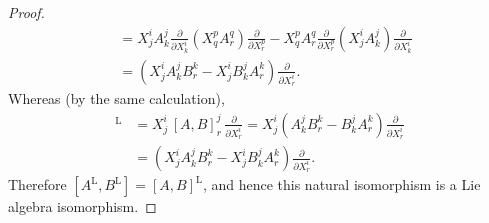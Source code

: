 \documentclass[a4paper]{article}
\theoremstyle{remark}
\newcommand{\doo}{\partial}    %
\newcommand{\Ltegak}{\text{L}} %
\begin{document}
\begin{proof}
\begin{align*}
&=X^i_j A^j_k \frac{\doo}{\doo X^i_k} ( X^p_q A^q_r ) \frac{\doo}{\doo X^p_r}  -  X^p_q A^q_r \frac{\doo}{\doo X^p_r} (X^i_j A^j_k ) \frac{\doo}{\doo X^i_k} \\
&= (X^i_jA^j_k B^k_r  - X^i_jB^j_kA^k_r) \frac{\doo}{\doo X^i_r}.
\end{align*}
Whereas (by the same calculation),
\begin{align*}
[A,B]^{\Ltegak} &= X^i_j \, [A,B]^j_r \,  \frac{\doo}{\doo X^i_r} = X^i_j (A^j_kB^k_r - B^j_kA^k_r) \frac{\doo}{\doo X^i_r}\\ &= (X^i_jA^j_k B^k_r  - X^i_jB^j_kA^k_r) \frac{\doo}{\doo X^i_r}.
\end{align*}
Therefore $[A^{\Ltegak},B^{\Ltegak}] = [A,B]^{\Ltegak}$, and hence this natural isomorphism is a Lie algebra isomorphism.
\end{proof}
\end{document}

